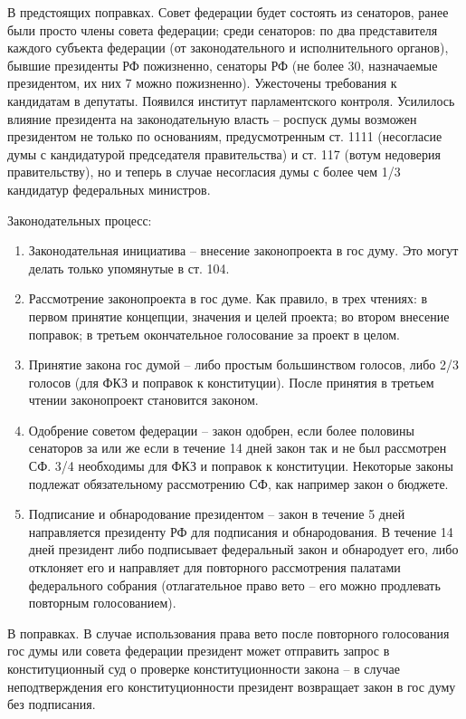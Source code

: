 \documentclass[a4paper, 12pt]{article}
\begin{document}
В предстоящих поправках. 
Совет федерации будет состоять из сенаторов, ранее были просто члены совета федерации; среди сенаторов: по два представителя каждого субъекта федерации (от законодательного и исполнительного органов), бывшие президенты РФ пожизненно, сенаторы РФ (не более 30, назначаемые президентом, их них 7 можно пожизненно). 
Ужесточены требования к кандидатам в депутаты. 
Появился институт парламентского контроля. 
Усилилось влияние президента на законодательную власть -- роспуск думы возможен президентом не только по основаниям, предусмотренным ст. 1111 (несогласие думы с кандидатурой председателя правительства) и ст. 117 (вотум недоверия правительству), но и теперь в случае несогласия думы с более чем 1/3 кандидатур федеральных министров. 

Законодательных процесс:
\begin{enumerate}
\item Законодательная инициатива -- внесение законопроекта в гос думу. Это могут делать только упомянутые в ст. 104. 
\item Рассмотрение законопроекта в гос думе. Как правило, в трех чтениях: в первом принятие концепции, значения и целей проекта; во втором внесение поправок; в третьем окончательное голосование за проект в целом. 
\item Принятие закона гос думой -- либо простым большинством голосов, либо 2/3 голосов (для ФКЗ и поправок к конституции). После принятия в третьем чтении законопроект становится законом. 
\item Одобрение советом федерации -- закон одобрен, если более половины сенаторов за или же если в течение 14 дней закон так и не был рассмотрен СФ. 3/4 необходимы для ФКЗ и поправок к конституции. Некоторые законы подлежат обязательному рассмотрению СФ, как например закон о бюджете. 
\item Подписание и обнародование президентом -- закон в течение 5 дней направляется президенту РФ для подписания и обнародования. В течение 14 дней президент либо подписывает федеральный закон и обнародует его, либо отклоняет его и направляет для повторного рассмотрения палатами федерального собрания (отлагательное право вето -- его можно продлевать повторным голосованием). 
\end{enumerate}
В поправках. В случае использования права вето после повторного голосования гос думы или совета федерации президент может отправить запрос в конституционный суд о проверке конституционности закона -- в случае неподтверждения его конституционности президент возвращает закон в гос думу без подписания. 
\end{document}
